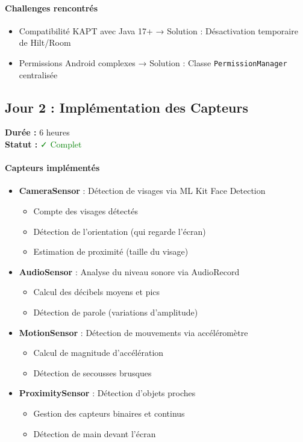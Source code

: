 \documentclass[11pt,a4paper]{article}
\begin{document}
\paragraph{Challenges rencontrés}
\begin{itemize}
    \item Compatibilité KAPT avec Java 17+ → Solution : Désactivation temporaire de Hilt/Room
    \item Permissions Android complexes → Solution : Classe \texttt{PermissionManager} centralisée
\end{itemize}

\subsection{Jour 2 : Implémentation des Capteurs}

\textbf{Durée :} 6 heures \\
\textbf{Statut :} \textcolor{green}{✓ Complet}

\paragraph{Capteurs implémentés}
\begin{itemize}
    \item \textbf{CameraSensor} : Détection de visages via ML Kit Face Detection
    \begin{itemize}
        \item Compte des visages détectés
        \item Détection de l'orientation (qui regarde l'écran)
        \item Estimation de proximité (taille du visage)
    \end{itemize}
    \item \textbf{AudioSensor} : Analyse du niveau sonore via AudioRecord
    \begin{itemize}
        \item Calcul des décibels moyens et pics
        \item Détection de parole (variations d'amplitude)
    \end{itemize}
    \item \textbf{MotionSensor} : Détection de mouvements via accéléromètre
    \begin{itemize}
        \item Calcul de magnitude d'accélération
        \item Détection de secousses brusques
    \end{itemize}
    \item \textbf{ProximitySensor} : Détection d'objets proches
    \begin{itemize}
        \item Gestion des capteurs binaires et continus
        \item Détection de main devant l'écran
    \end{itemize}
\end{itemize}
\end{document}
